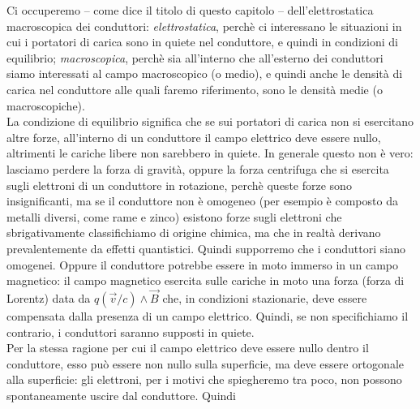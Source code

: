 Ci occuperemo -- come dice il titolo di questo capitolo -- dell'elettrostatica
macroscopica dei conduttori: \emph{elettrostatica}, perch\`e ci interessano le
situazioni in cui i portatori di carica sono in quiete nel conduttore, e quindi
in condizioni di equilibrio; \emph{macroscopica}, perch\`e sia all'interno che
all'esterno dei conduttori siamo interessati al campo macroscopico (o medio), e
quindi anche le densit\`a di carica nel conduttore alle quali faremo
riferimento, sono le densit\`a medie (o macroscopiche).\\
La condizione di equilibrio significa che se sui portatori di carica non si
esercitano altre forze, all'interno di un conduttore il campo elettrico deve
essere nullo, altrimenti le cariche libere non sarebbero in quiete. In generale
questo non \`e vero: lasciamo perdere la forza di gravit\`a, oppure la forza
centrifuga che si esercita sugli elettroni di un conduttore in rotazione,
perch\`e queste forze sono insignificanti, ma se il conduttore non \`e omogeneo
(per esempio \`e composto da metalli diversi, come rame e zinco) esistono forze
sugli elettroni che sbrigativamente classifichiamo di origine chimica, ma che in
realt\`a derivano prevalentemente da effetti quantistici. Quindi supporremo che
i conduttori siano omogenei. Oppure il conduttore potrebbe essere in moto
immerso in un campo
magnetico: il campo magnetico esercita sulle cariche in moto una forza (forza di
Lorentz) data da $q(\vec v/c)\wedge\vec B$ che, in condizioni stazionarie, deve
essere compensata dalla presenza di un campo elettrico. Quindi, se non
specifichiamo il contrario, i conduttori saranno supposti in quiete.\\
Per la stessa ragione per cui il campo elettrico deve essere nullo dentro il
conduttore, esso pu\`o essere non nullo sulla superficie, ma deve essere
ortogonale alla superficie: gli elettroni, per i motivi che spiegheremo tra
poco, non possono spontaneamente uscire dal conduttore. Quindi
